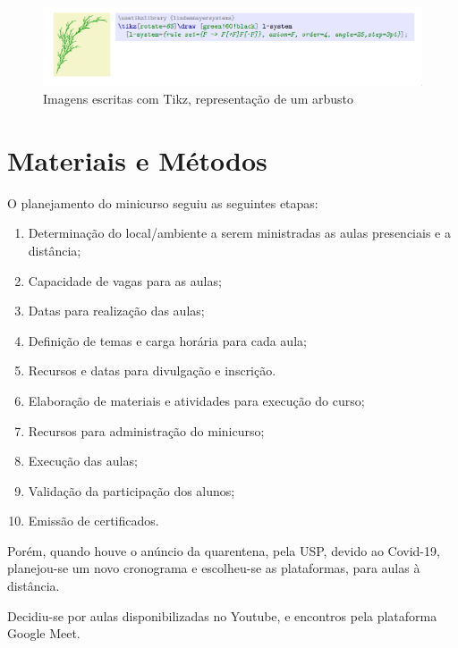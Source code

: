 \documentclass[
12pt,				%
openright,			%
oneside,			%
a4paper,			%
english,			%
french,				%
spanish,			%
brazil,				%
]{abntex2}
\begin{document}
\begin{figure}[t]
  \caption{\label{im:6} Imagens escritas com Tikz, representação de um
    arbusto}
  \begin{center}
    \includegraphics[width=\linewidth]{./Imagens/5.png}
  \end{center}
\end{figure}

\clearpage



\chapter{Materiais e Métodos}

O planejamento do minicurso seguiu as seguintes etapas:

\begin{enumerate}
\item Determinação do local/ambiente a serem ministradas as aulas presenciais e a distância;
\item Capacidade de vagas para as aulas;
\item Datas para realização das aulas;
\item Definição de temas e carga horária para cada aula;
\item Recursos e datas para divulgação e inscrição.
\item Elaboração de materiais e atividades para execução do curso;
\item Recursos para administração do minicurso;
\item Execução das aulas;
\item Validação da participação dos alunos;
\item Emissão de certificados.
\end{enumerate}

Porém, quando houve o anúncio da quarentena, pela USP, devido ao
Covid-19, planejou-se um novo cronograma e escolheu-se as plataformas,
para aulas à distância.

Decidiu-se por aulas disponibilizadas no Youtube, e encontros pela
plataforma Google Meet.
\end{document}
